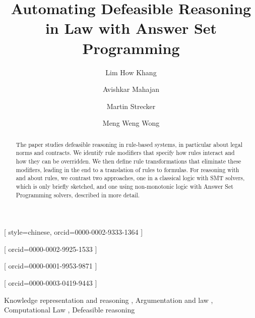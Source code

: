 \documentclass[]{ceurart}
\begin{document}


\title{Automating Defeasible Reasoning in Law with Answer Set Programming}

\author{Lim How Khang}[%
style=chinese,
orcid=0000-0002-9333-1364
]
%
\author{Avishkar Mahajan}[%
orcid=0000-0002-9925-1533
]
%
\author{Martin Strecker}[%
orcid=0000-0001-9953-9871
]
%
\author{Meng Weng Wong}[%
orcid=0000-0003-0419-9443
]
\address{Singapore Management University}

\begin{abstract}
The paper studies defeasible reasoning in rule-based systems, in particular
about legal norms and contracts. We identify rule modifiers that specify how
rules interact and how they can be overridden. We then define rule
transformations that eliminate these modifiers, leading in the end to a
translation of rules to formulas. For reasoning with and about rules, we
contrast two approaches, one in a classical logic with SMT solvers, which is
only briefly sketched, and one using non-monotonic logic with Answer Set
Programming solvers, described in more detail.
\end{abstract}

\begin{keywords}
  Knowledge representation and reasoning
  \sep
  Argumentation and law
  \sep
  Computational Law
  \sep
  Defeasible reasoning
\end{keywords}

\maketitle







% 


\end{document}
